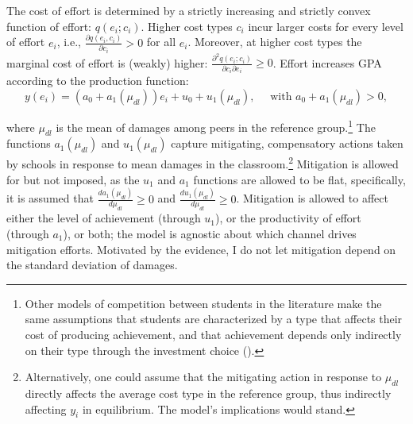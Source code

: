 The cost of effort is determined by a strictly increasing and strictly convex function of effort: $q(e_i;c_i)$. Higher cost types $c_i$ incur larger costs for every level of effort $e_i$, i.e., $\frac{\partial q(e_i,c_i)}{\partial c_i}>0$ for all $e_i$. Moreover, at higher cost types the marginal cost of effort is (weakly) higher: $\frac{\partial^2 q(e_i;c_i)}{\partial c_i \partial e_i}\geq 0$. Effort increases GPA according to the production function: 
\vskip-10pt
\begin{equation}\label{eq:y_prod}
    y(e_i)=(a_0+a_1(\mu_{dl}))e_i+u_0+u_1(\mu_{dl}),\quad \mbox{ with } a_0+a_1(\mu_{dl})>0,
\end{equation}



\noindent where  $\mu_{dl}$ is the mean of damages among peers in the reference group.\footnote{Other models of competition between students in the literature make the same assumptions that students are characterized by a type that affects their cost of producing achievement, and that achievement depends only indirectly on their type through the investment choice (\cite{bodoh2017pre,bodoh2018college,cotton2022affirmative}).\label{footnote:R2point4}} The functions $a_1(\mu_{dl}) $ and $u_1(\mu_{dl})$ capture mitigating, compensatory actions taken by schools in response to mean damages in the classroom.\footnote{Alternatively, one could assume that the mitigating action in response to $\mu_{dl}$ directly affects the average cost type in the reference group, thus indirectly affecting $y_i$ in equilibrium. The model's implications would stand. } Mitigation is allowed for but not imposed, as the $u_1$ and $a_1$ functions are allowed to be flat, specifically, it is assumed that $\frac{d a_1(\mu_{dl})}{d \mu_{dl}}\geq 0$ and $\frac{d u_1(\mu_{dl})}{d\mu_{dl}}\geq 0$. Mitigation is allowed to affect either the level of achievement (through $u_1$), or the productivity of effort (through $a_1$), or both; the model is agnostic about which channel drives mitigation efforts. Motivated by the evidence, I do not let mitigation depend on the standard deviation of damages.\par 
